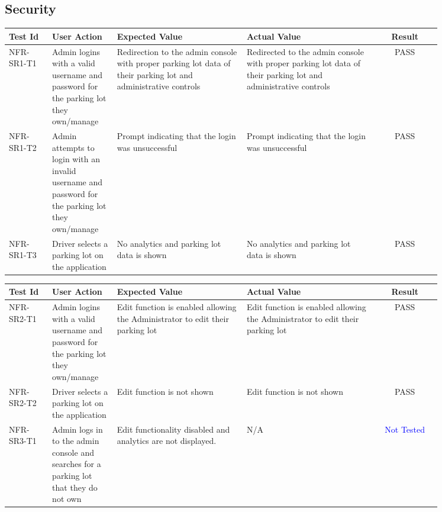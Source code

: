 \documentclass[12pt, titlepage]{article}
\begin{document}
\subsection{Security}
\begin{center}
\begin{tabular}{|p{0.10\linewidth}|p{0.15\linewidth}|p{0.30\linewidth}|p{0.30\linewidth}|c|} 
\hline
\textbf{Test Id} & \textbf{User Action} & \textbf{Expected Value} &
\textbf{Actual Value} & \textbf{Result} \\
\hline 
NFR-SR1-T1 & Admin logins with a valid username and password for the parking lot
they own/manage & Redirection to the admin console with proper parking lot data
of their parking lot and administrative controls & Redirected to the admin
console with proper parking lot data of their parking lot and administrative
controls & \textcolor{OliveGreen}{PASS}\\
\hline 
NFR-SR1-T2 & Admin attempts to login with an invalid username and password for
the parking lot they own/manage & Prompt indicating that the login was
unsuccessful & Prompt indicating that the login was unsuccessful &
\textcolor{OliveGreen}{PASS}\\
\hline 
NFR-SR1-T3 & Driver selects a parking lot on the application & No analytics and
parking lot data is shown & No analytics and parking lot data is shown &
\textcolor{OliveGreen}{PASS}\\
\hline
\end{tabular}

\begin{tabular}{|p{0.10\linewidth}|p{0.15\linewidth}|p{0.30\linewidth}|p{0.30\linewidth}|c|} 
\hline
\textbf{Test Id} & \textbf{User Action} & \textbf{Expected Value} &
\textbf{Actual Value} & \textbf{Result} \\
\hline
NFR-SR2-T1 & Admin logins with a valid username and password for the parking lot
they own/manage & Edit function is enabled allowing the Administrator to edit
their parking lot & Edit function is enabled allowing the Administrator to edit
their parking lot & \textcolor{OliveGreen}{PASS}\\
\hline 
NFR-SR2-T2 & Driver selects a parking lot on the application & Edit function is
not shown &  Edit function is not shown & \textcolor{OliveGreen}{PASS}\\
\hline
NFR-SR3-T1 & Admin logs in to the admin console and searches for a parking lot
that they do not own & Edit functionality disabled and analytics are not
displayed. & N/A & \textcolor{Blue}{Not Tested}\\
\hline
\end{tabular}


\end{center}
\end{document}
